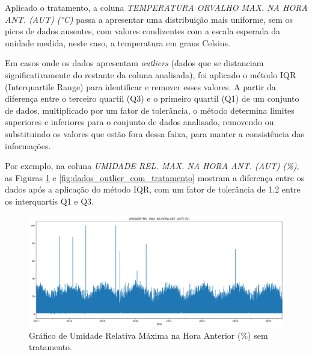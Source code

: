 Aplicado o tratamento, a coluna \textit{TEMPERATURA ORVALHO MAX. NA HORA ANT. (AUT) (°C)} passa a apresentar uma distribuição mais uniforme, sem os picos de dados ausentes, com valores condizentes com a escala esperada da unidade medida, neste caso, a temperatura em graus Celsius.

Em casos onde os dados apresentam \textit{outliers} (dados que se distanciam significativamente do restante da coluna analisada), foi aplicado o método IQR (Interquartile Range) para identificar e remover esses valores. A partir da diferença entre o terceiro quartil (Q3) e o primeiro quartil (Q1) de um conjunto de dados, multiplicado por um fator de tolerância, o método determina limites superiores e inferiores para o conjunto de dados analisado, removendo ou substituindo os valores que estão fora dessa faixa, para manter a consistência das informações.

Por exemplo, na coluna \textit{UMIDADE REL. MAX. NA HORA ANT. (AUT) (\%)}, as Figuras \ref{fig:dados_outlier_sem_tratamento} e \ref{fig:dados_outlier_com_tratamento} mostram a diferença entre os dados após a aplicação do método IQR, com um fator de tolerância de 1.2 entre os interquartis Q1 e Q3.

\begin{figure}[H]
	\caption{\label{fig:dados_outlier_sem_tratamento}Gráfico de Umidade Relativa Máxima  na Hora Anterior (\%) sem tratamento.}
	\begin{center}
		\includegraphics[scale=0.35]{figuras/UMIDADE REL. MAX. NA HORA ANT. (AUT) SEM TRATAMENTO.png}
	\end{center}
\end{figure}

